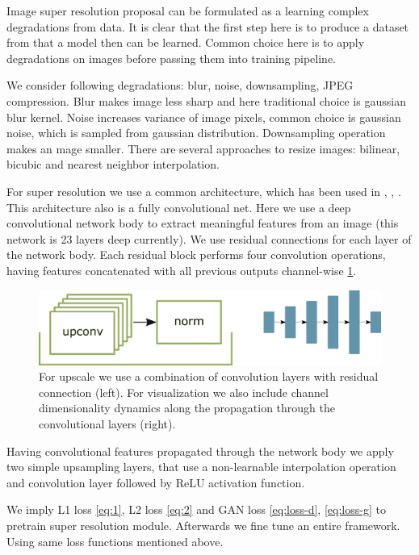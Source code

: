 Image super resolution proposal can be formulated as a learning complex degradations from data. It is clear that the first step here is to produce a dataset from that a model then can be learned. Common choice here is to apply degradations on images before passing them into training pipeline.

We consider following degradations: blur, noise, downsampling, JPEG compression. Blur makes image less sharp and here traditional choice is gaussian blur kernel. Noise increases variance of image pixels, common choice is gaussian noise, which is sampled from gaussian distribution. Downsampling operation makes an mage smaller. There are several approaches to resize images: bilinear, bicubic and nearest neighbor interpolation.

For super resolution we use a common architecture, which has been used in \cite{Ledig_Theis_Huszar_Caballero_Cunningham_Acosta_Aitken_Tejani_Totz_Wang_et_al_2017}, \cite{Wang_Yu_Wu_Gu_Liu_Dong_Qiao_Loy_2019}, \cite{Wang_Xie_Dong_Shan_2021}. This architecture also is a fully convolutional net. Here we use a deep convolutional network body to extract meaningful features from an image (this network is 23 layers deep currently). We use residual connections for each layer of the network body. Each residual block performs four convolution operations, having features concatenated with all previous outputs channel-wise \ref{upscale}.

\begin{figure}[!ht]
    \centering
    \includegraphics[width=\textwidth]{figure/upscale.png}
    \caption{For upscale we use a combination of convolution layers with residual connection (left). For visualization we also include channel dimensionality dynamics along the propagation through the convolutional layers (right).}
    \label{upscale}
\end{figure}

Having convolutional features propagated through the network body we apply two simple upsampling layers, that use a non-learnable interpolation operation and convolution layer followed by ReLU activation function.

We imply L1 loss \ref{eq:1}, L2 loss \ref{eq:2} and GAN loss \ref{eq:loss-d}, \ref{eq:loss-g} to pretrain super resolution module. Afterwards we fine tune an entire framework. Using same loss functions mentioned above.

